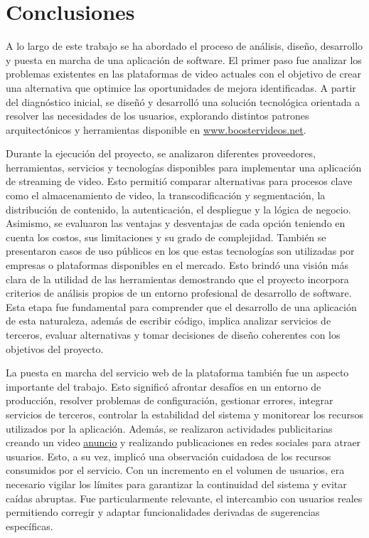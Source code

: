 \chapter{Conclusiones}

A lo largo de este trabajo se ha abordado el proceso de análisis, diseño, desarrollo y puesta en marcha de una aplicación de software. El primer paso fue analizar los problemas existentes en las plataformas de video actuales con el objetivo de crear una alternativa que optimice las oportunidades de mejora identificadas. A partir del diagnóstico inicial, se diseñó y desarrolló una solución tecnológica orientada a resolver las necesidades de los usuarios, explorando distintos patrones arquitectónicos y herramientas disponible en \href{http://boostervideos.net}{\underline{www.boostervideos.net}}. 

Durante la ejecución del proyecto, se analizaron diferentes proveedores, herramientas, servicios y tecnologías disponibles para implementar una aplicación de streaming de video. Esto permitió comparar alternativas para procesos clave como el almacenamiento de video, la transcodificación y segmentación, la distribución de contenido, la autenticación, el despliegue y la lógica de negocio. Asimismo, se evaluaron las ventajas y desventajas de cada opción teniendo en cuenta los costos, sus limitaciones y su grado de complejidad. También se presentaron casos de uso públicos en los que estas tecnologías son utilizadas por empresas o plataformas disponibles en el mercado. Esto brindó una visión más clara de la utilidad de las herramientas demostrando que el proyecto incorpora criterios de análisis propios de un entorno profesional de desarrollo de software. Esta etapa fue fundamental para comprender que el desarrollo de una aplicación de esta naturaleza, además de escribir código, implica analizar servicios de terceros, evaluar alternativas y tomar decisiones de diseño coherentes con los objetivos del proyecto.

La puesta en marcha del servicio web de la plataforma también fue un aspecto importante del trabajo. Esto significó afrontar desafíos en un entorno de producción, resolver problemas de configuración, gestionar errores, integrar servicios de terceros, controlar la estabilidad del sistema y monitorear los recursos utilizados por la aplicación. Además, se realizaron actividades publicitarias creando un video  \href{http://boostervideos.net}{\underline{anuncio}}  y realizando publicaciones en redes sociales para atraer usuarios. Esto, a su vez, implicó una observación cuidadosa de los recursos consumidos por el servicio. Con un incremento en el volumen de usuarios, era necesario vigilar los límites para garantizar la continuidad del sistema y evitar caídas abruptas. Fue particularmente relevante, el intercambio con usuarios reales permitiendo corregir y adaptar funcionalidades derivadas de sugerencias específicas.

